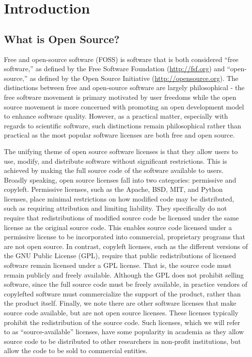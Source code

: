 \section{Introduction}

\subsection*{What is Open Source?}

Free and open-source software (FOSS) is software that is both considered ``free software,'' as defined by the Free Software Foundation (\url{http://fsf.org}) and ``open-source,'' as defined by the Open Source Initiative (\url{http://opensource.org}).  The distinctions between free and open-source software are largely philosophical  - the free software movement is primary motivated by user freedoms while the open source movement is more concerned with promoting an open development model to enhance software quality.  However, as a practical matter, especially with regards to scientific software, such distinctions remain philosophical rather than practical as the most popular software licenses are both free and open source.  

The unifying theme of open source software licenses is that they allow users to use, modify, and distribute software without significant restrictions.  This is achieved by making the full source code of the software available to users.  Broadly speaking, open source licenses fall into two categories: permissive and copyleft. Permissive licenses, such as the Apache, BSD, MIT, and Python licenses, place minimal restrictions on how modified code may be distributed, such as requiring attribution and limiting liability.  They specifically do not require that redistributions of modified source code be licensed under the same license as the original source code.  This enables source code licensed under a permissive license to be incorporated into commercial, proprietary programs that are not open source.  In contrast, copyleft licenses, such as the different versions of the GNU Public License (GPL), require that public redistributions of licensed software remain licensed under a GPL license.  That is, the source code must remain publicly and freely available. Although the GPL does not prohibit selling software, since the full source code must be freely available, in practice vendors of copylefted software must commercialize the support of the product, rather than the product itself. Finally, we note there are other software licenses that make source code available, but are not open source licenses.  These licenses typically prohibit the redistribution of the source code.  Such licenses, which we will refer to as ``source-available'' licenses, have some popularity in academia as they allow source code to be distributed to other researchers in non-profit institutions, but allow the code to be sold to commercial entities. 

